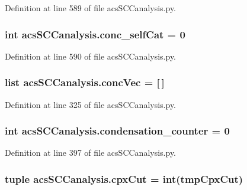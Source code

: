 Definition at line 589 of file acs\-S\-C\-Canalysis.\-py.

\hypertarget{a00128_a9e8cc07f7d7f892f3f72274318dcbcef}{
\subsubsection[{conc\-\_\-self\-Cat}]{\setlength{\rightskip}{0pt plus 5cm}int acs\-S\-C\-Canalysis.\-conc\-\_\-self\-Cat = 0}}\label{a00128_a9e8cc07f7d7f892f3f72274318dcbcef}


Definition at line 590 of file acs\-S\-C\-Canalysis.\-py.

\hypertarget{a00128_a1681853ab5f5859e51f219caa07a8539}{
\subsubsection[{conc\-Vec}]{\setlength{\rightskip}{0pt plus 5cm}list acs\-S\-C\-Canalysis.\-conc\-Vec = \mbox{[}$\,$\mbox{]}}}\label{a00128_a1681853ab5f5859e51f219caa07a8539}


Definition at line 325 of file acs\-S\-C\-Canalysis.\-py.

\hypertarget{a00128_a144441bdbe6e835849cf165ea2946848}{
\subsubsection[{condensation\-\_\-counter}]{\setlength{\rightskip}{0pt plus 5cm}int acs\-S\-C\-Canalysis.\-condensation\-\_\-counter = 0}}\label{a00128_a144441bdbe6e835849cf165ea2946848}


Definition at line 397 of file acs\-S\-C\-Canalysis.\-py.

\hypertarget{a00128_a06673ec4592e44a89a443073b8a29011}{
\subsubsection[{cpx\-Cut}]{\setlength{\rightskip}{0pt plus 5cm}tuple acs\-S\-C\-Canalysis.\-cpx\-Cut = int(tmp\-Cpx\-Cut)}}\label{a00128_a06673ec4592e44a89a443073b8a29011}


